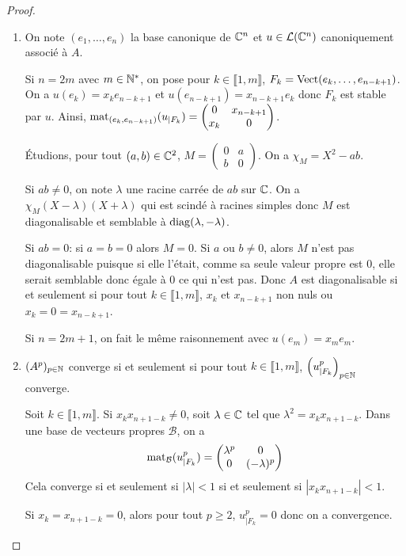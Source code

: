 \documentclass[12pt]{article}
\begin{document}
\begin{proof}
	\phantom{}
	\begin{enumerate}
		\item On note $(e_{1},\dots,e_{n})$ la base canonique de $\mathbb{C}^{n}$ et $u\in\mathcal{L}(\mathbb{C}^{n})$ canoniquement associé à $A$. 
		
		Si $n=2m$ avec $m\in\mathbb{N}^{*}$, on pose pour $k\in\llbracket1,m\rrbracket$, $F_{k}=\operatorname{Vect}(e_{k},\dots,e_{n-k+1})$. On a $u(e_{k})=x_{k}e_{n-k+1}$ et $u(e_{n-k+1})=x_{n-k+1}e_{k}$ donc $F_{k}$ est stable par $u$. Ainsi, $\operatorname{mat}_{(e_{k},e_{n-k+1})}(u_{\mid F_{k}})=\begin{pmatrix}
			0&x_{n-k+1}\\ x_{k}&0
		\end{pmatrix}$. 

		Étudions, pour tout $(a,b)\in\mathbb{C}^{2}$, $M=\begin{pmatrix}
			0&a\\b&0
		\end{pmatrix}$. On a $\chi_{M}=X^{2}-ab$. 
		
		Si $ab\neq0$, on note $\lambda$ une racine carrée de $ab$ sur $\mathbb{C}$. On a $\chi_{M}(X-\lambda)(X+\lambda)$ qui est scindé à racines simples donc $M$ est diagonalisable et semblable à $\operatorname{diag}(\lambda,-\lambda)$.

		Si $ab=0$: si $a=b=0$ alors $M=0$. Si $a$ ou $b\neq0$, alors $M$ n'est pas diagonalisable puisque si elle l'était, comme sa seule valeur propre est 0, elle serait semblable donc égale à 0 ce qui n'est pas. Donc $A$ est diagonalisable si et seulement si pour tout $k\in\llbracket1,m\rrbracket$, $x_{k}$ et $x_{n-k+1}$ non nuls ou $x_{k}=0=x_{n-k+1}$.

		Si $n=2m+1$, on fait le même raisonnement avec $u(e_{m})=x_{m}e_{m}$.

		\item $(A^{p})_{p\in\mathbb{N}}$ converge si et seulement si pour tout $k\in\llbracket1,m\rrbracket$, $\left(u_{\mid F_{k}}^{p}\right)_{p\in\mathbb{N}}$ converge. 
		
		Soit $k\in\llbracket1,m\rrbracket$. Si $x_{k}x_{n+1-k}\neq0$, soit $\lambda\in\mathbb{C}$ tel que $\lambda^{2}=x_{k}x_{n+1-k}$. Dans une base de vecteurs propres $\mathcal{B}$, on a 
		\begin{equation}
			\operatorname{mat}_{\mathcal{B}}(u_{\mid F_{k}}^{p})=\begin{pmatrix}
				\lambda^{p}&0\\0&(-\lambda)^{p}
			\end{pmatrix}
		\end{equation}
		Cela converge si et seulement si $\lvert\lambda\rvert<1$ si et seulement si $\left\lvert x_{k}x_{n+1-k}\right\rvert<1$.

		Si $x_{k}=x_{n+1-k}=0$, alors pour tout $p\geqslant2$, $u_{\mid F_{k}}^{p}=0$ donc on a convergence.
	\end{enumerate}
\end{proof}
\end{document}

